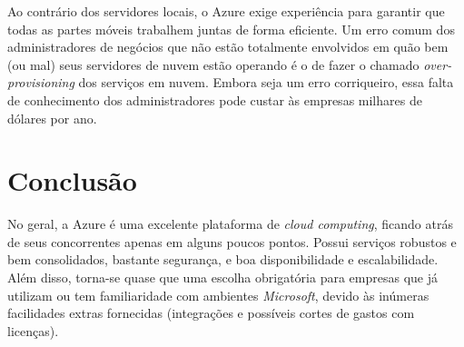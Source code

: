 Ao contrário dos servidores locais, o Azure exige experiência para garantir que todas as partes móveis trabalhem juntas de forma eficiente. Um erro comum dos administradores de negócios que não estão totalmente envolvidos em quão bem (ou mal) seus servidores de nuvem estão operando é o de fazer o chamado \textit{over-provisioning} dos serviços em nuvem. Embora seja um erro corriqueiro, essa falta de conhecimento dos administradores pode custar às empresas milhares de dólares por ano.


\section{Conclusão}
No geral, a Azure é uma excelente plataforma de  \textit{cloud computing}, ficando atrás de seus concorrentes apenas em alguns poucos pontos. Possui serviços robustos e bem consolidados, bastante segurança, e boa disponibilidade e escalabilidade. Além disso, torna-se quase que uma escolha obrigatória para empresas que já utilizam ou tem familiaridade com ambientes \textit{Microsoft}, devido às inúmeras facilidades extras fornecidas (integrações e possíveis cortes de gastos com licenças).  
